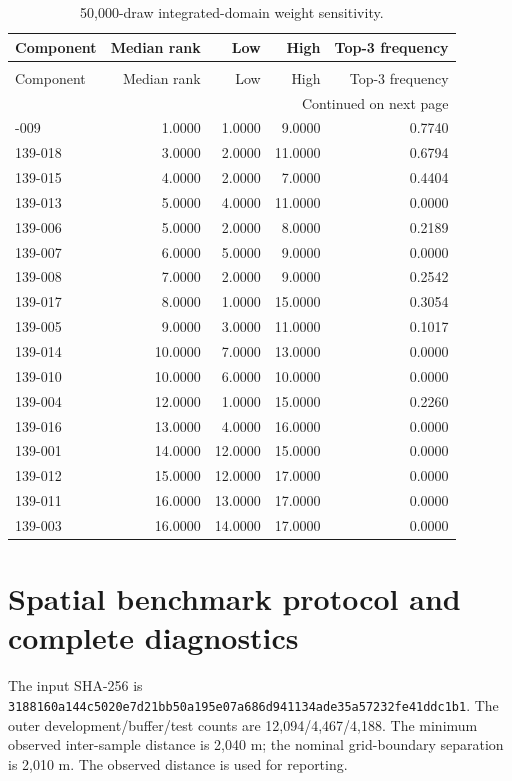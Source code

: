 \documentclass[10pt,a4paper]{article}
\begin{document}
\begin{longtable}{lrrrr}
\caption{50,000-draw integrated-domain weight sensitivity.} \\
\toprule
Component & Median rank & Low & High & Top-3 frequency \\
\midrule
\endfirsthead
\caption[]{50,000-draw integrated-domain weight sensitivity.} \\
\toprule
Component & Median rank & Low & High & Top-3 frequency \\
\midrule
\endhead
\midrule
\multicolumn{5}{r}{Continued on next page} \\
\midrule
\endfoot
\bottomrule
\endlastfoot
139-009 & 1.0000 & 1.0000 & 9.0000 & 0.7740 \\
139-018 & 3.0000 & 2.0000 & 11.0000 & 0.6794 \\
139-015 & 4.0000 & 2.0000 & 7.0000 & 0.4404 \\
139-013 & 5.0000 & 4.0000 & 11.0000 & 0.0000 \\
139-006 & 5.0000 & 2.0000 & 8.0000 & 0.2189 \\
139-007 & 6.0000 & 5.0000 & 9.0000 & 0.0000 \\
139-008 & 7.0000 & 2.0000 & 9.0000 & 0.2542 \\
139-017 & 8.0000 & 1.0000 & 15.0000 & 0.3054 \\
139-005 & 9.0000 & 3.0000 & 11.0000 & 0.1017 \\
139-014 & 10.0000 & 7.0000 & 13.0000 & 0.0000 \\
139-010 & 10.0000 & 6.0000 & 10.0000 & 0.0000 \\
139-004 & 12.0000 & 1.0000 & 15.0000 & 0.2260 \\
139-016 & 13.0000 & 4.0000 & 16.0000 & 0.0000 \\
139-001 & 14.0000 & 12.0000 & 15.0000 & 0.0000 \\
139-012 & 15.0000 & 12.0000 & 17.0000 & 0.0000 \\
139-011 & 16.0000 & 13.0000 & 17.0000 & 0.0000 \\
139-003 & 16.0000 & 14.0000 & 17.0000 & 0.0000 \\
\end{longtable}

\section{Spatial benchmark protocol and complete diagnostics}
The input SHA-256 is \texttt{3188160a144c5020e7d21bb50a195e07a686d941134ade35a57232fe41ddc1b1}. The outer development/buffer/test counts are 12,094/4,467/4,188. The minimum observed inter-sample distance is 2,040 m; the nominal grid-boundary separation is 2,010 m. The observed distance is used for reporting.
\end{document}
